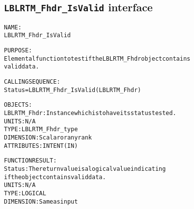 \subsection{\texttt{LBLRTM\_Fhdr\_IsValid} interface}
  \label{sec:LBLRTM_Fhdr_IsValid_interface}
  \begin{alltt}
 
  NAME:
        LBLRTM_Fhdr_IsValid
 
  PURPOSE:
        Elemental function to test if the LBLRTM_Fhdr object contains
        valid data.
 
  CALLING SEQUENCE:
        Status = LBLRTM_Fhdr_IsValid( LBLRTM_Fhdr )
 
  OBJECTS:
        LBLRTM_Fhdr:   Instance which is to have its status tested.
                       UNITS:      N/A
                       TYPE:       LBLRTM_Fhdr_type
                       DIMENSION:  Scalar or any rank
                       ATTRIBUTES: INTENT(IN)
 
  FUNCTION RESULT:
        Status:        The return value is a logical value indicating
                       if the object contains valid data.
                       UNITS:      N/A
                       TYPE:       LOGICAL
                       DIMENSION:  Same as input
 
  \end{alltt}
